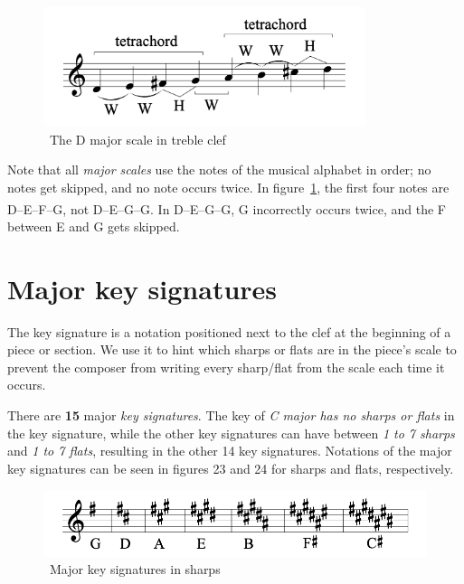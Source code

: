 \begin{figure}
    \centering
    \includegraphics[width=0.84\textwidth]{assets/major-scale-staff}
    \caption{~The D major scale in treble clef~\cite{music-theory}}\label{fig:major-scale-staff}
\end{figure}

Note that all \textit{major scales} use the notes of the musical alphabet in order;
no notes get skipped, and no note occurs twice.
In figure~\ref{fig:major-scale-staff}, the first four notes are D--E--F\textsuperscript{\sh}--G, not D--E--G\textsuperscript{\fl}--G.
In D--E--G\textsuperscript{\fl}--G, G incorrectly occurs twice, and the F\textsuperscript{\sh} between E and G gets skipped.~\cite{music-theory}


\section{Major key signatures}\label{sec:major-key-signatures}

The key signature is a notation positioned next to the clef at the beginning of a piece or section.
We use it to hint which sharps or flats are in the piece's scale to prevent the composer from writing every sharp/flat from the scale each time it occurs.~\cite{music-theory}

There are \textbf{15} major \textit{key signatures}.
The key of \textit{C major has no sharps or flats} in the key signature, while the other key signatures can have between \textit{1 to 7 sharps} and \textit{1 to 7 flats}, resulting in the other 14 key signatures.
Notations of the major key signatures can be seen in figures 23 and 24 for sharps and flats, respectively.~\cite{music-theory}


\begin{figure}
    \centering
    \includegraphics[width=\textwidth]{assets/major-signatures-sharps}
    \caption{~Major key signatures in sharps~\cite{music-theory}}\label{fig:major-signatures-sharps}
\end{figure}


